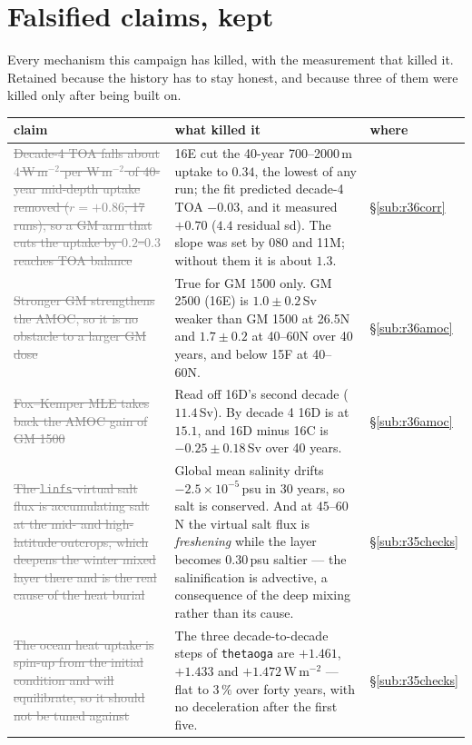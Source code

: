 \documentclass[10pt]{article}
\newcommand{\dead}[1]{\textcolor{gray}{\sout{#1}}}
\begin{document}
\section{Falsified claims, kept}\label{sec:falsified}
Every mechanism this campaign has killed, with the measurement that killed it. Retained
because the history has to stay honest, and because three of them were killed only after
being built on.

\begin{center}\footnotesize
\begin{tabular}{p{} p{} l}
\toprule
claim & what killed it & where \\
\midrule
\dead{Decade-4 TOA falls about $4$\,W\,m$^{-2}$ per W\,m$^{-2}$ of 40-year mid-depth uptake
removed ($r=+0.86$, 17 runs), so a GM arm that cuts the uptake by $0.2$--$0.3$ reaches TOA
balance} &
16E cut the 40-year 700--2000\,m uptake to $0.34$, the lowest of any run; the fit predicted
decade-4 TOA $-0.03$, and it measured $+0.70$ ($4.4$ residual sd). The slope was set by 080
and 11M; without them it is about $1.3$. &
\S\ref{sub:r36corr} \\
\midrule
\dead{Stronger GM strengthens the AMOC, so it is no obstacle to a larger GM dose} &
True for GM 1500 only. GM 2500 (16E) is $1.0\pm0.2$\,Sv weaker than GM 1500 at 26.5N and
$1.7\pm0.2$ at 40--60N over 40 years, and below 15F at 40--60N. &
\S\ref{sub:r36amoc} \\
\midrule
\dead{Fox--Kemper MLE takes back the AMOC gain of GM 1500} &
Read off 16D's second decade ($11.4$\,Sv). By decade 4 16D is at $15.1$, and 16D minus 16C is
$-0.25\pm0.18$\,Sv over 40 years. &
\S\ref{sub:r36amoc} \\
\midrule
\dead{The \texttt{linfs} virtual salt flux is accumulating salt at the mid- and
high-latitude outcrops, which deepens the winter mixed layer there and is the real cause
of the heat burial} &
Global mean salinity drifts $-2.5\times10^{-5}$\,psu in 30 years, so salt is conserved.
And at $45$--$60$N the virtual salt flux is \emph{freshening} while the layer becomes
$0.30$\,psu saltier --- the salinification is advective, a consequence of the deep mixing
rather than its cause. &
\S\ref{sub:r35checks} \\
\midrule

\dead{The ocean heat uptake is spin-up from the initial condition and will equilibrate,
so it should not be tuned against} &
The three decade-to-decade steps of \texttt{thetaoga} are $+1.461$, $+1.433$ and
$+1.472$\,W\,m$^{-2}$ --- flat to $3\,\%$ over forty years, with no deceleration after
the first five. &
\S\ref{sub:r35checks} \\
\midrule


\end{tabular}
\end{center}
\end{document}
